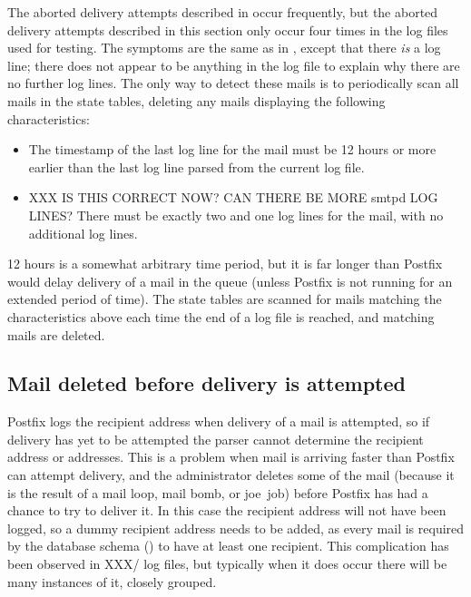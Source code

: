 \label{yet-more-aborted-delivery-attempts}

The aborted delivery attempts described in
 occur frequently, but the aborted
delivery attempts described in this section only occur four times in the
\numberOFlogFILES{} log files used for testing.  The symptoms are the same
as in , except that there
\textit{is\/} a  log line; there does not appear to be
anything in the log file to explain why there are no further log lines.
The only way to detect these mails is to periodically scan all mails in the
state tables, deleting any mails displaying the following characteristics:

\begin{itemize}

    \item The timestamp of the last log line for the mail must be 12 hours
        or more earlier than the last log line parsed from the current log
        file.

    \item XXX IS THIS CORRECT NOW\@?  CAN THERE BE MORE smtpd LOG LINES\@?
        There must be exactly two  and one 
        log lines for the mail, with no additional log lines.

\end{itemize}

12 hours is a somewhat arbitrary time period, but it is far longer than
Postfix would delay delivery of a mail in the queue (unless Postfix is not
running for an extended period of time).  The state tables are scanned for
mails matching the characteristics above each time the end of a log file is
reached, and matching mails are deleted.

\subsection{Mail deleted before delivery is attempted}

\label{Mail deleted before delivery is attempted}

Postfix logs the recipient address when delivery of a mail is attempted, so
if delivery has yet to be attempted the parser cannot determine the
recipient address or addresses.  This is a problem when mail is arriving
faster than Postfix can attempt delivery, and the administrator deletes
some of the mail (because it is the result of a mail loop, mail bomb, or joe~job) before
Postfix has had a chance to try to deliver it.  In this case the recipient
address will not have been logged, so a dummy recipient address needs to be
added, as every mail is required by the database schema
() to have at least one recipient.  This
complication has been observed in XXX/\numberOFlogFILES{} log files, but
typically when it does occur there will be many instances of it, closely
grouped.

